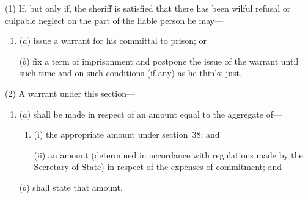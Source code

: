 \documentclass[12pt,a4paper]{article}
\begin{document}
%
%
%
%
%
%
%

(1) If, but only if, the sheriff is satisfied that there has been wilful refusal or culpable neglect on the part of the liable person he may—
\begin{enumerate}\item[]
($a$) issue a warrant for his committal to prison; or

($b$) fix a term of imprisonment and postpone the issue of the warrant until such time and on such conditions (if any) as he thinks just.
\end{enumerate}

(2) A warrant under this section—
\begin{enumerate}\item[]
($a$) shall be made in respect of an amount equal to the aggregate of—
\begin{enumerate}\item[]
(i) the appropriate amount under section~38; and

(ii) an amount (determined in accordance with regulations made by the Secretary of State) in respect of the expenses of commitment; and
\end{enumerate}

($b$) shall state that amount.
\end{enumerate}
\end{document}
